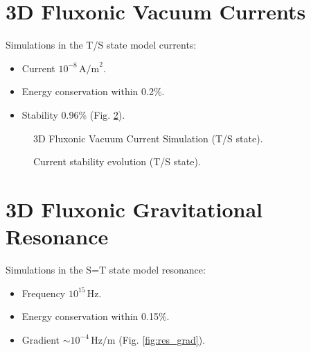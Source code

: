 \documentclass[11pt]{article}
\begin{document}
\section{3D Fluxonic Vacuum Currents}
Simulations in the T/S state model currents:
\begin{itemize}
    \item Current \(10^{-8} \, \text{A/m}^2\).
    \item Energy conservation within 0.2\%.
    \item Stability 0.96\% (Fig. \ref{fig:current_stab}).
\end{itemize}

\begin{figure}[ht]
    \centering
    \caption{3D Fluxonic Vacuum Current Simulation (T/S state).}
    \label{fig:3Dcurrent}
\end{figure}

\begin{figure}[ht]
    \centering
    \caption{Current stability evolution (T/S state).}
    \label{fig:current_stab}
\end{figure}

\section{3D Fluxonic Gravitational Resonance}
Simulations in the S=T state model resonance:
\begin{itemize}
    \item Frequency \(10^{15} \, \text{Hz}\).
    \item Energy conservation within 0.15\%.
    \item Gradient \(\sim 10^{-4} \, \text{Hz/m}\) (Fig. \ref{fig:res_grad}).
\end{itemize}
\end{document}
